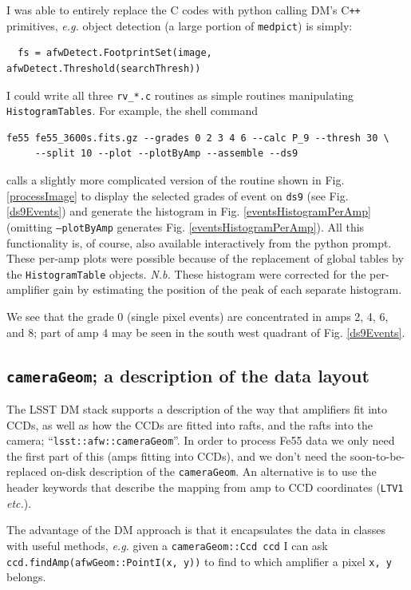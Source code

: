 \documentclass[12pt]{article}
\newcommand{\CPP}{C\texttt{++}\xspace}  %
\begin{document}
I was able to entirely replace the C codes with python calling DM's \CPP primitives, \textit{e.g.}
object detection (a large portion of \texttt{medpict}) is simply:
\begin{lstlisting}
  fs = afwDetect.FootprintSet(image, afwDetect.Threshold(searchThresh))
\end{lstlisting}
I could write all three \texttt{rv\_*.c} routines as simple routines manipulating \texttt{HistogramTables}.
For example, the shell command
\begin{verbatim}
fe55 fe55_3600s.fits.gz --grades 0 2 3 4 6 --calc P_9 --thresh 30 \
     --split 10 --plot --plotByAmp --assemble --ds9
\end{verbatim}
calls a slightly more complicated version of the routine shown in Fig. \ref{processImage} to
display the selected grades of event on \texttt{ds9} (see Fig. \ref{ds9Events}) and generate
the histogram in Fig. \ref{eventsHistogramPerAmp} (omitting \texttt{--plotByAmp} generates
Fig. \ref{eventsHistogramPerAmp}).  All this functionality is, of course, also available
interactively from the python prompt.
These per-amp plots were possible because of the replacement of global tables by the \texttt{HistogramTable}
objects.  \textit{N.b.} These histogram were corrected for the per-amplifier gain by estimating the position
of the peak of each separate histogram.

We see that the grade 0 (single pixel events) are concentrated in amps 2, 4, 6, and 8; part of
amp 4 may be seen in the south west quadrant of Fig. \ref{ds9Events}.

\subsection{\texttt{cameraGeom}; a description of the data layout}

The LSST DM stack supports a description of the way that amplifiers fit into CCDs, as well as how the CCDs are
fitted into rafts, and the rafts into the camera; ``\texttt{lsst::afw::cameraGeom}''.
In order to process Fe55 data we only need the first part
of this (amps fitting into CCDs), and we don't need the soon-to-be-replaced on-disk description of
the \texttt{cameraGeom}.  An alternative is to use the header keywords that describe the mapping
from amp to CCD coordinates (\texttt{LTV1} \textit{etc.}).

The advantage of the DM approach is that it encapsulates the data in classes with useful methods,
\textit{e.g.} given a \texttt{cameraGeom::Ccd ccd} I can ask \texttt{ccd.findAmp(afwGeom::PointI(x, y))}
to find to which amplifier a pixel \texttt{x, y} belongs.
\end{document}
